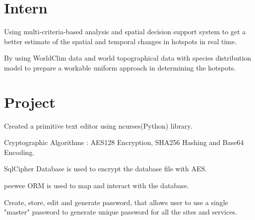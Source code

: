 \documentclass[]{deedy-resume-openfont}
\begin{document}
\hfill
\begin{minipage}[t]{0.66\textwidth}

\section{Intern}
\vspace{\topsep} %
\begin{tightemize}
\item Using multi-criteria-based analysis and spatial decision support system to get a better estimate of the spatial and temporal changes in hotspots in real time.
\item  By using WorldClim data and world topographical data with species distribution model to prepare a workable uniform approach in determining the hotspots.
\end{tightemize}
\sectionsep



\section{Project}

\begin{tightemize}
\item Created a primitive text editor using ncurses(Python) library.
\item Cryptographic Algorithms : AES128 Encryption, SHA256 Hashing and Base64 Encoding.

\end{tightemize}
\sectionsep


\begin{tightemize}
\item SqlCipher Database is used to encrypt the database file with AES.
\item peewee ORM is used to map and interact with the database.
\item Create, store, edit and generate password, that allows user to use a single "master" password to
generate unique password for all the sites and services.
\end{tightemize}
\sectionsep



\end{minipage}
\end{document}
